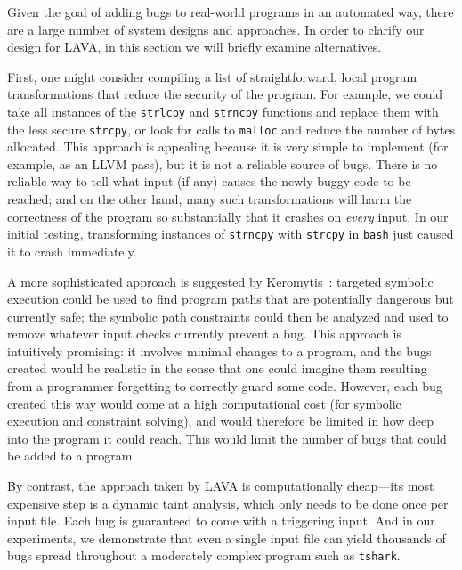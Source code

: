 Given the goal of adding bugs to real-world programs in an automated way, there are a large number of system designs and approaches.
In order to clarify our design for LAVA, in this section we will briefly examine alternatives.

First, one might consider compiling a list of straightforward, local program transformations that reduce the security of the program. 
For example, we could take all instances of the \texttt{strlcpy} and \texttt{strncpy} functions and replace them with the less secure \texttt{strcpy}, or look for calls to \texttt{malloc} and reduce the number of bytes allocated.
This approach is appealing because it is very simple to implement (for example, as an LLVM pass), but it is not a reliable source of bugs. 
There is no reliable way to tell what input (if any) causes the newly buggy code to be reached; and on the other hand, many such transformations will harm the correctness of the program so substantially that it crashes on \emph{every} input.
In our initial testing, transforming instances of \texttt{strncpy} with \texttt{strcpy} in \texttt{bash} just caused it to crash immediately.

A more sophisticated approach is suggested by Keromytis~\cite{}: targeted symbolic execution could be used to find program paths that are potentially dangerous but currently safe; the symbolic path constraints could then be analyzed and used to remove whatever input checks currently prevent a bug. 
This approach is intuitively promising: it involves minimal changes to a program, and the bugs created would be realistic in the sense that one could imagine them resulting from a programmer forgetting to correctly guard some code. 
However, each bug created this way would come at a high computational cost (for symbolic execution and constraint solving), and would therefore be limited in how deep into the program it could reach. 
This would limit the number of bugs that could be added to a program.

By contrast, the approach taken by LAVA is computationally cheap---its most expensive step is a dynamic taint analysis, which only needs to be done once per input file. 
Each bug is guaranteed to come with a triggering input. 
And in our experiments, we demonstrate that even a single input file can yield thousands of bugs spread throughout a moderately complex program such as \texttt{tshark}.
